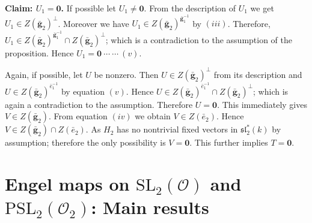 \documentclass[10pt,twoside]{amsart}
\newcommand{\SL}{\mathrm{SL}}
\theoremstyle{definition}
\theoremstyle{definition}
\begin{document}
    \textbf{Claim: $U_1=\mathbf{0}$. } If possible let $U_1\neq \mathbf{0}$. From the description of $U_1$ we get $U_1\in Z(\mathbf{\bar g}_2)^{\perp}$. Moreover we have $U_1\in Z(\mathbf{\bar g}_2)^{\mathbf{\bar g}_1^{-1}}$ by $(iii)$. Therefore, $U_1\in Z(\mathbf{\bar g}_2)^{\mathbf{\bar g}_1^{-1}}\cap Z(\mathbf{\bar g}_2)^{\perp}$; which is a contradiction to the assumption of the proposition. Hence $\boxed{U_1=\mathbf{0}}\ \cdots \ \cdots\ (v)$.
    
    Again, if possible, let $U$ be nonzero. Then $U\in Z(\mathbf{\bar g}_2)^{\perp}$ from its description and $U\in Z(\mathbf{\bar g}_2)^{\bar e_1^{-1}}$ by equation $(v)$. Hence $U\in Z(\mathbf{\bar g}_2)^{\bar e_1^{-1}}\cap Z(\mathbf{\bar g}_2)^{\perp} $; which is again a contradiction to the assumption. Therefore $U=\mathbf{0}$. This immediately gives $V\in Z(\mathbf{\bar g}_2)$. From equation $(iv)$ we obtain $V\in Z(\bar e_2)$. Hence $V\in Z(\mathbf{\bar g}_2)\cap Z(\bar e_2) $. As $H_2$ has no nontrivial fixed vectors in $\mathfrak{sl}_2^*(k)$ by assumption; therefore the only possibility is $V=\mathbf{0}$. This further implies $T=\mathbf{0}$.
    \fi 





 


\section{Engel maps on $\SL_2(\mathcal O)$ and $\text{PSL}_2(\mathcal O_2)$: Main results}{\label{mainth}}
\end{document}
